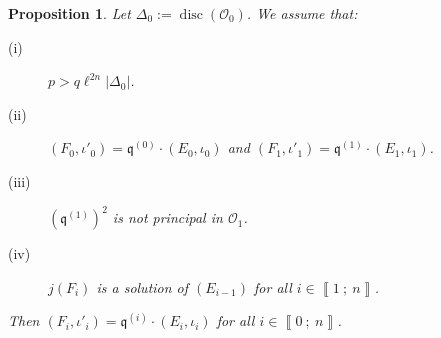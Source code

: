 \documentclass[a4paper,10pt]{report}
\theoremstyle{definition}
\theoremstyle{plain}
\newtheorem{proposition}[definition]{Proposition}
\theoremstyle{definition}
\newcommand{\mO}{\mathcal{O}}
\renewcommand{\i}[2]{\left\llbracket #1~;~#2\right\rrbracket}
\renewcommand{\(}{\left(}
\renewcommand{\)}{\right)}
\newcommand{\mf}[1]{\mathfrak{#1}}
\newcommand{\mfq}{\mathfrak{q}}
\DeclareMathOperator{\disc}{disc}
\begin{document}
\begin{proposition}\label{proposition 9}
Let $\Delta_0:=\disc(\mO_0)$. We assume that:
\begin{description}
\item[(i)] $p>q\ell^{2n}|\Delta_0|$.
\item[(ii)] $(F_0,\iota'_0)=\mf{q}^{(0)}\cdot(E_{0},\iota_0)$ and $(F_1,\iota'_1)=\mf{q}^{(1)}\cdot(E_{1},\iota_1)$.
\item[(iii)] $(\mfq^{(1)})^2$ is not principal in $\mO_1$.
\item[(iv)] $j(F_{i})$ is a solution of $(E_{i-1})$ for all $i\in\i{1}{n}$. 
\end{description}
Then $(F_{i},\iota'_{i})=\mf{q}^{(i)}\cdot(E_{i},\iota_i)$ for all $i\in\i{0}{n}$.  
\end{proposition}
\end{document}
